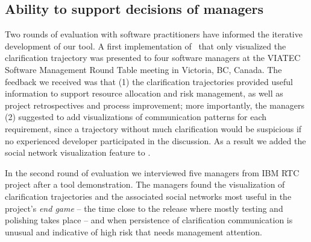 \subsection{Ability to support decisions of managers}
Two rounds of evaluation with software practitioners have informed the iterative development of our tool. A first implementation of \viss\ that only visualized the clarification trajectory was presented to four software managers at the VIATEC Software Management Round Table meeting in Victoria, BC, Canada. The feedback we received was that (1) the clarification trajectories provided useful information to support resource allocation and risk management, as well as project retrospectives and process improvement; more importantly, the managers (2) suggested to add visualizations of communication patterns for each requirement, since a trajectory without much clarification would be suspicious if no experienced developer participated in the discussion. As a result we added the social network visualization feature to \viss. 


In the second round of evaluation we interviewed five managers from IBM RTC project after a tool demonstration. The managers found the visualization of clarification trajectories and the associated social networks most useful in the project's \emph{end game} -- the time close to the release where mostly testing and polishing takes place -- and when persistence of  clarification communication is unusual and indicative of high risk that needs management attention.
